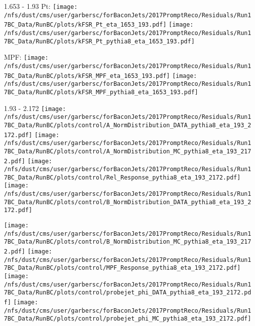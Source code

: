 \documentclass[t,compress]{beamer}
\begin{document}
\begin{frame}{1.653 - 1.93}
	 Pt: \texttt{[image: /nfs/dust/cms/user/garbersc/forBaconJets/2017PromptReco/Residuals/Run17BC\_Data/RunBC/plots/kFSR\_Pt\_eta\_1653\_193.pdf]}
	\texttt{[image: /nfs/dust/cms/user/garbersc/forBaconJets/2017PromptReco/Residuals/Run17BC\_Data/RunBC/plots/kFSR\_Pt\_pythia8\_eta\_1653\_193.pdf]}
\newline

	 MPF: \texttt{[image: /nfs/dust/cms/user/garbersc/forBaconJets/2017PromptReco/Residuals/Run17BC\_Data/RunBC/plots/kFSR\_MPF\_eta\_1653\_193.pdf]}
	\texttt{[image: /nfs/dust/cms/user/garbersc/forBaconJets/2017PromptReco/Residuals/Run17BC\_Data/RunBC/plots/kFSR\_MPF\_pythia8\_eta\_1653\_193.pdf]}
\end{frame}

\begin{frame}{1.93 - 2.172}
	\texttt{[image: /nfs/dust/cms/user/garbersc/forBaconJets/2017PromptReco/Residuals/Run17BC\_Data/RunBC/plots/control/A\_NormDistribution\_DATA\_pythia8\_eta\_193\_2172.pdf]}
	\texttt{[image: /nfs/dust/cms/user/garbersc/forBaconJets/2017PromptReco/Residuals/Run17BC\_Data/RunBC/plots/control/A\_NormDistribution\_MC\_pythia8\_eta\_193\_2172.pdf]}
	\texttt{[image: /nfs/dust/cms/user/garbersc/forBaconJets/2017PromptReco/Residuals/Run17BC\_Data/RunBC/plots/control/Rel\_Response\_pythia8\_eta\_193\_2172.pdf]}
	\texttt{[image: /nfs/dust/cms/user/garbersc/forBaconJets/2017PromptReco/Residuals/Run17BC\_Data/RunBC/plots/control/B\_NormDistribution\_DATA\_pythia8\_eta\_193\_2172.pdf]}
\newline

	\texttt{[image: /nfs/dust/cms/user/garbersc/forBaconJets/2017PromptReco/Residuals/Run17BC\_Data/RunBC/plots/control/B\_NormDistribution\_MC\_pythia8\_eta\_193\_2172.pdf]}
	\texttt{[image: /nfs/dust/cms/user/garbersc/forBaconJets/2017PromptReco/Residuals/Run17BC\_Data/RunBC/plots/control/MPF\_Response\_pythia8\_eta\_193\_2172.pdf]}
	\texttt{[image: /nfs/dust/cms/user/garbersc/forBaconJets/2017PromptReco/Residuals/Run17BC\_Data/RunBC/plots/control/probejet\_phi\_DATA\_pythia8\_eta\_193\_2172.pdf]}
	\texttt{[image: /nfs/dust/cms/user/garbersc/forBaconJets/2017PromptReco/Residuals/Run17BC\_Data/RunBC/plots/control/probejet\_phi\_MC\_pythia8\_eta\_193\_2172.pdf]}
\end{frame}
\end{document}
